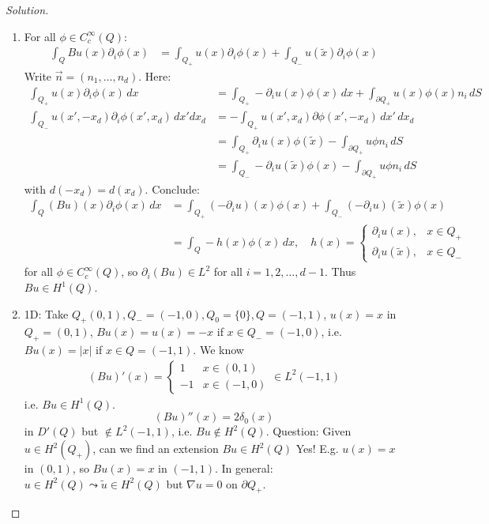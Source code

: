 \documentclass{report}
\theoremstyle{tommy}
\begin{document}
  \begin{proof}[Solution]
    \begin{enumerate}
      \item For all \(\phi \in C_c^\infty(Q)\):
        \begin{align*}
          \int_Q Bu(x) \partial_i \phi(x) &= \int_{Q_+} u(x) \partial_i \phi(x) + \int_{Q_-} u(\tilde x) \partial_i \phi(x)
        \end{align*}
        Write \(\vec{n} = (n_1, \dots, n_d)\). Here:
        \begin{align*}
          \int_{Q_+} u(x) \partial_i \phi(x) \, dx &= \int_{Q_+} - \partial_i u(x) \phi(x) \, dx + \int_{\partial Q_+} u(x) \phi(x) n_i \, dS \\
          \int_{Q_-}u(x', -x_d) \partial_i \phi(x', x_d) \, dx' dx_d &= -\int_{Q_+} u(x', x_d) \partial \phi(x', -x_d) \, dx' \, dx_d \\
          &= \int_{Q_+} \partial_i u(x) \phi(\tilde x) - \int_{\partial Q_+} u \phi n_i \, dS \\
          &= \int_{Q_-} - \partial_i u(\tilde x) \phi(x)- \int_{\partial Q_+} u \phi n_i \, dS
        \end{align*}
        with \(d(-x_d) = d(x_d)\). Conclude:
        \begin{align*}
          \int_Q (Bu)(x) \partial_i \phi(x) \, dx 
          &= \int_{Q_+}(-\partial_iu)(x) \phi(x) + \int_{Q_-} (-\partial_i u) (\tilde x) \phi(x) \\
          &= \int_Q - h(x) \phi(x) \, dx, \quad h(x) = \begin{cases}
            \partial_i u(x), & x \in Q_+ \\ \partial_i u(\tilde x), & x \in Q_-
          \end{cases}
        \end{align*}
        for all \(\phi \in C_c^\infty(Q)\), so \(\partial_i (Bu) \in L^2\) for all \(i = 1, 2, \dots, d-1\). Thus \(Bu \in H^1(Q)\).
      \item 1D: Take \(Q_+(0,1), Q_-=(-1,0), Q_0= \{0\}, Q=(-1,1)\), \(u(x) = x\) in \(Q_+ = (0,1)\), \(Bu(x) = u(x) = -x\) if \(x \in Q_- = (-1,0)\), i.e. \(Bu(x) = |x|\) if \(x \in Q = (-1,1)\). We know 
      \begin{align*}
        (Bu)'(x) = \begin{cases}
          1 &  x \in (0,1) \\ -1 & x \in (-1,0)
        \end{cases} \in L^2(-1,1)
      \end{align*}
      i.e. \(B u \in H^1(Q)\).
      \[(Bu)''(x) = 2 \delta_0(x)\]
      in \(D'(Q)\) but \(\notin L^2(-1,1)\), i.e. \(Bu \notin H^2(Q)\).
    Question: Given \(u \in H^2(Q_+)\), can we find an extension \(Bu \in H^2(Q)\) Yes! E.g. \(u(x) = x\) in \((0,1)\), so \(Bu(x) = x\) in \((-1,1)\). In general: \(u \in H^2(Q) \leadsto \tilde u \in H^2(Q)\) but \(\nabla u = 0\) on \(\partial Q_+\). \qedhere
  \end{enumerate}
  \end{proof}
\end{document}
